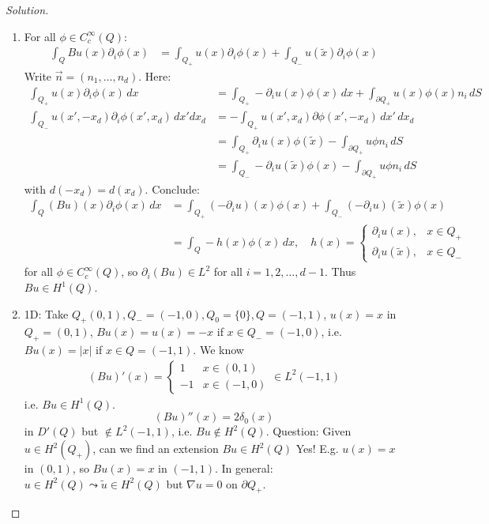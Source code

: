 \documentclass{report}
\theoremstyle{tommy}
\begin{document}
  \begin{proof}[Solution]
    \begin{enumerate}
      \item For all \(\phi \in C_c^\infty(Q)\):
        \begin{align*}
          \int_Q Bu(x) \partial_i \phi(x) &= \int_{Q_+} u(x) \partial_i \phi(x) + \int_{Q_-} u(\tilde x) \partial_i \phi(x)
        \end{align*}
        Write \(\vec{n} = (n_1, \dots, n_d)\). Here:
        \begin{align*}
          \int_{Q_+} u(x) \partial_i \phi(x) \, dx &= \int_{Q_+} - \partial_i u(x) \phi(x) \, dx + \int_{\partial Q_+} u(x) \phi(x) n_i \, dS \\
          \int_{Q_-}u(x', -x_d) \partial_i \phi(x', x_d) \, dx' dx_d &= -\int_{Q_+} u(x', x_d) \partial \phi(x', -x_d) \, dx' \, dx_d \\
          &= \int_{Q_+} \partial_i u(x) \phi(\tilde x) - \int_{\partial Q_+} u \phi n_i \, dS \\
          &= \int_{Q_-} - \partial_i u(\tilde x) \phi(x)- \int_{\partial Q_+} u \phi n_i \, dS
        \end{align*}
        with \(d(-x_d) = d(x_d)\). Conclude:
        \begin{align*}
          \int_Q (Bu)(x) \partial_i \phi(x) \, dx 
          &= \int_{Q_+}(-\partial_iu)(x) \phi(x) + \int_{Q_-} (-\partial_i u) (\tilde x) \phi(x) \\
          &= \int_Q - h(x) \phi(x) \, dx, \quad h(x) = \begin{cases}
            \partial_i u(x), & x \in Q_+ \\ \partial_i u(\tilde x), & x \in Q_-
          \end{cases}
        \end{align*}
        for all \(\phi \in C_c^\infty(Q)\), so \(\partial_i (Bu) \in L^2\) for all \(i = 1, 2, \dots, d-1\). Thus \(Bu \in H^1(Q)\).
      \item 1D: Take \(Q_+(0,1), Q_-=(-1,0), Q_0= \{0\}, Q=(-1,1)\), \(u(x) = x\) in \(Q_+ = (0,1)\), \(Bu(x) = u(x) = -x\) if \(x \in Q_- = (-1,0)\), i.e. \(Bu(x) = |x|\) if \(x \in Q = (-1,1)\). We know 
      \begin{align*}
        (Bu)'(x) = \begin{cases}
          1 &  x \in (0,1) \\ -1 & x \in (-1,0)
        \end{cases} \in L^2(-1,1)
      \end{align*}
      i.e. \(B u \in H^1(Q)\).
      \[(Bu)''(x) = 2 \delta_0(x)\]
      in \(D'(Q)\) but \(\notin L^2(-1,1)\), i.e. \(Bu \notin H^2(Q)\).
    Question: Given \(u \in H^2(Q_+)\), can we find an extension \(Bu \in H^2(Q)\) Yes! E.g. \(u(x) = x\) in \((0,1)\), so \(Bu(x) = x\) in \((-1,1)\). In general: \(u \in H^2(Q) \leadsto \tilde u \in H^2(Q)\) but \(\nabla u = 0\) on \(\partial Q_+\). \qedhere
  \end{enumerate}
  \end{proof}
\end{document}
